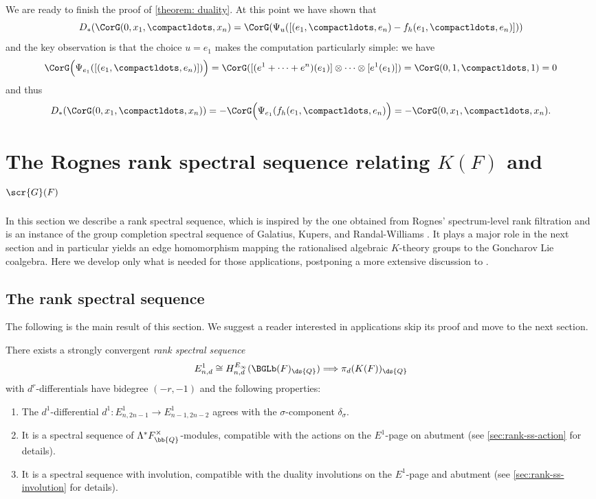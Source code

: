 \documentclass[a4paper]{amsart}
\begin{document}
We are ready to finish the proof of \cref{theorem: duality}. At this point we have shown that 
\[D_*(\CorG(0,x_1,\compactldots,x_n) = \CorG(\Psi_u([(e_1,\compactldots,e_n)-f_h(e_1,\compactldots,e_n)]))\] and the key observation is that the choice $u=e_1$ makes the computation particularly simple: we have 
\[
\CorG \Bigl(\Psi_{e_1}([(e_1,\compactldots,e_n)])\Bigr)=\CorG([(e^1+\dots+e^n)(e_1)]\otimes \dots \otimes [e^1(e_1)])=\CorG(0,1,\compactldots,1)=0
\]
and thus
\[
D_*(\CorG(0,x_1,\compactldots,x_n))=-\CorG \Bigl( \Psi_{e_1}(f_h(e_1,\compactldots,e_n)\Bigr)= -\CorG(0,x_1,\compactldots,x_n).
\]


\section{The Rognes rank spectral sequence relating $K(F)$ and $\scr{G}(F)$} In this section we describe a rank spectral sequence, which is inspired by the one obtained from Rognes' spectrum-level rank filtration \cite{Rognes} and is an instance of the group completion spectral sequence of Galatius, Kupers, and Randal-Williams \cite{GKRW18}. It plays a major role in the next section and in particular yields an edge homomorphism mapping the rationalised algebraic $K$-theory groups to the Goncharov Lie coalgebra. Here we develop only what is needed for those applications, postponing a more extensive discussion to \cite{KRS2}.

\subsection{The rank spectral sequence} The following is the main result of this section. We suggest a reader interested in applications skip its proof and move to the next section. 

\begin{theorem}\label{thm:rank-ss-omnibus} There exists a strongly convergent \emph{rank spectral sequence}
\[E^1_{n,d} \cong H^{E_\infty}_{n,d}(\BGLb(F)_\ds{Q}) \Longrightarrow \pi_d(K(F))_\ds{Q}\]
with $d^r$-differentials have bidegree $(-r,-1)$ and the following properties:
\begin{enumerate}
    \item The $d^1$-differential $d^1 \colon E^1_{n,2n-1} \to E^1_{n-1,2n-2}$ agrees with the $\sigma$-component $\delta_\sigma$.    \item It is a spectral sequence of $\Lambda^* F^\times_\bb{Q}$-modules, compatible with the actions on the $E^1$-page on abutment (see \cref{sec:rank-ss-action} for details).
    \item It is a spectral sequence with involution, compatible with the duality involutions on the $E^1$-page and abutment (see \cref{sec:rank-ss-involution} for details).
\end{enumerate}
\end{theorem}
\end{document}
